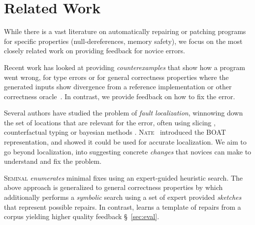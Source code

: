 \section{Related Work}
\label{sec:related-work}

While there is a vast literature on automatically repairing or patching 
programs for specific properties (\eg null-dereferences, memory safety),
we focus on the most closely related work on providing feedback for novice 
errors.

%
Recent work has looked at providing \emph{counterexamples} 
that show how a program went wrong, for type errors 
\cite{Seidel2016-ul} or for general correctness properties 
where the generated inputs show divergence from a reference 
implementation or other correctness oracle~\cite{Song_2019}.
In contrast, we provide feedback on how to fix the error.

 Several authors have studied 
the problem of \emph{fault localization}, \ie winnowing down 
the set of locations that are relevant for the error, often 
using slicing \citep{Wand1986-nw,Haack2003-vc,Tip2001-qp,Rahli2015-tt},
counterfactual typing \citep{Chen2014-gd} or bayesian methods \citep{Zhang2014-lv}.
%
\textsc{Nate}~\citep{Seidel:2017} introduced the BOAT representation, 
and showed it could be used for accurate localization.
%
We aim to go beyond localization, into suggesting concrete 
\emph{changes} that novices can make to understand and fix 
the problem.

%
\textsc{Seminal} \citep{Lerner2007-dt} \emph{enumerates} minimal fixes 
using an expert-guided heuristic search. 
%
The above approach is generalized to general correctness properties 
by \cite{singh2013} which additionally performs a \emph{symbolic} 
search using a set of expert provided \emph{sketches} that represent 
possible repairs. 
%
In contrast, \toolname learns a template of repairs 
from a corpus yielding higher quality feedback \S~\ref{sec:eval}.

